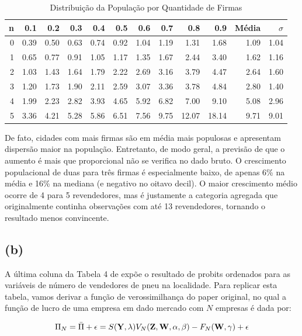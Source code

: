 \documentclass{article}
\begin{document}
\begin{table}[H]\centering
\begin{tabular}{r|r|r|r|r|r|r|r|r|r|r|r}
\hline
n & 0.1 & 0.2 &  0.3 &  0.4 &  0.5 &  0.6 &  0.7 &  0.8 &  0.9 & Média & $\sigma$\\
\hline\hline
0 & 0.39 & 0.50 & 0.63 & 0.74 & 0.92 & 1.04 & 1.19 & 1.31 & 1.68 & 1.09 & 1.04\\
\hline
1 & 0.65 & 0.77 & 0.91 & 1.05 & 1.17 & 1.35 & 1.67 & 2.44 & 3.40 & 1.62 & 1.16\\
\hline
2 & 1.03 & 1.43 & 1.64 & 1.79 & 2.22 & 2.69 & 3.16 & 3.79 & 4.47 & 2.64 & 1.60\\
\hline
3 & 1.20 & 1.73 & 1.90 & 2.11 & 2.59 & 3.07 & 3.36 & 3.78 & 4.84 & 2.80 & 1.40\\
\hline
4 & 1.99 & 2.23 & 2.82 & 3.93 & 4.65 & 5.92 & 6.82 & 7.00 & 9.10 & 5.08 & 2.96\\
\hline
5 & 3.36 & 4.21 & 5.28 & 5.86 & 6.51 & 7.56 & 9.75 & 12.07 & 18.14 & 9.71 & 9.01\\
\hline
\end{tabular}
\caption{Distribuição da População por Quantidade de Firmas}
\end{table}

De fato, cidades com mais firmas são em média mais populosas e apresentam dispersão maior na população. Entretanto, de modo geral, a previsão de que o aumento é mais que proporcional não se verifica no dado bruto. O crescimento populacional de duas para três firmas é especialmente baixo, de apenas 6\% na média e 16\% na mediana (e negativo no oitavo decil). O maior crescimento médio ocorre de 4 para 5 revendedores, mas é justamente a categoria agregada que originalmente continha observações com até 13 revendedores, tornando o resultado menos convincente.

\subsection*{(b)}

A última coluna da Tabela 4 de  expõe o resultado de probits ordenados para as variáveis de número de vendedores de pneu na localidade. Para replicar esta tabela, vamos derivar a função de verossimilhança do paper original, no qual a função de lucro de uma empresa em dado mercado com $N$ empresas é dada por:

\begin{equation*}
    \Pi_N= \Bar{\Pi} + \epsilon = S(\mathbf{Y},\lambda)V_N(\mathbf{Z},\mathbf{W},\alpha,\beta)-F_N(\mathbf{W},\gamma)+\epsilon
\end{equation*}
\end{document}
